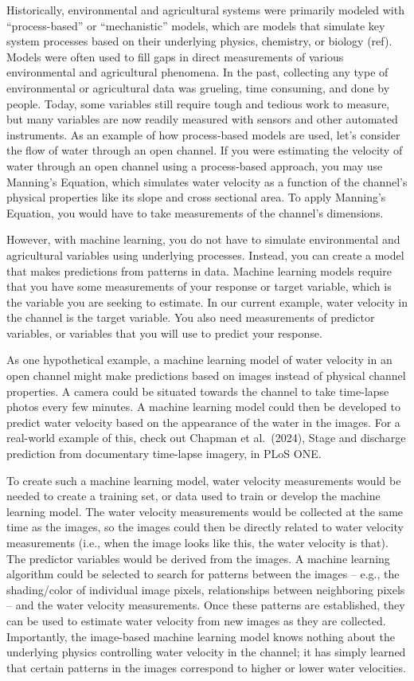 \documentclass[
]{book}
\begin{document}
Historically, environmental and agricultural systems were primarily modeled with ``process-based'' or ``mechanistic'' models, which are models that simulate key system processes based on their underlying physics, chemistry, or biology (ref). Models were often used to fill gaps in direct measurements of various environmental and agricultural phenomena. In the past, collecting any type of environmental or agricultural data was grueling, time consuming, and done by people. Today, some variables still require tough and tedious work to measure, but many variables are now readily measured with sensors and other automated instruments.
As an example of how process-based models are used, let's consider the flow of water through an open channel. If you were estimating the velocity of water through an open channel using a process-based approach, you may use Manning's Equation, which simulates water velocity as a function of the channel's physical properties like its slope and cross sectional area. To apply Manning's Equation, you would have to take measurements of the channel's dimensions.

However, with machine learning, you do not have to simulate environmental and agricultural variables using underlying processes. Instead, you can create a model that makes predictions from patterns in data. Machine learning models require that you have some measurements of your response or target variable, which is the variable you are seeking to estimate. In our current example, water velocity in the channel is the target variable. You also need measurements of predictor variables, or variables that you will use to predict your response.

As one hypothetical example, a machine learning model of water velocity in an open channel might make predictions based on images instead of physical channel properties. A camera could be situated towards the channel to take time-lapse photos every few minutes. A machine learning model could then be developed to predict water velocity based on the appearance of the water in the images. For a real-world example of this, check out Chapman et al.~(2024), Stage and discharge prediction from documentary time-lapse imagery, in PLoS ONE.

To create such a machine learning model, water velocity measurements would be needed to create a training set, or data used to train or develop the machine learning model. The water velocity measurements would be collected at the same time as the images, so the images could then be directly related to water velocity measurements (i.e., when the image looks like this, the water velocity is that). The predictor variables would be derived from the images. A machine learning algorithm could be selected to search for patterns between the images -- e.g., the shading/color of individual image pixels, relationships between neighboring pixels -- and the water velocity measurements. Once these patterns are established, they can be used to estimate water velocity from new images as they are collected. Importantly, the image-based machine learning model knows nothing about the underlying physics controlling water velocity in the channel; it has simply learned that certain patterns in the images correspond to higher or lower water velocities.
\end{document}
